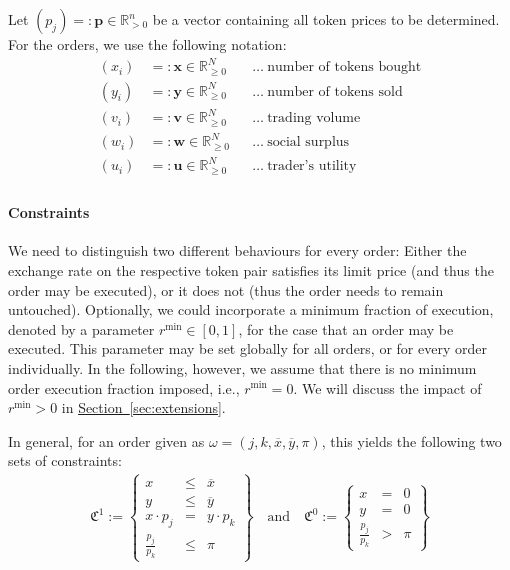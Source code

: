 \documentclass[11pt,parskip=full]{scrartcl}%
\newcommand*{\ie}{i.e., }
\newcommand*{\Min}{\mathrm{min}}
\newcommand*{\secref}[1]{\hyperref[{#1}]{Section~\ref*{#1}}}
\begin{document}
Let $(p_j) =: \mathbf{p} \in \mathbb{R}^n_{> 0}$ be a vector containing all token prices to be determined.
For the orders, we use the following notation:
\begin{align*}
  (x_i) &=: \mathbf{x} \in \mathbb{R}^N_{\ge 0} && \ldots\>\text{number of tokens bought}\\
  (y_i) &=: \mathbf{y} \in \mathbb{R}^N_{\ge 0} && \ldots\>\text{number of tokens sold}\\[2mm]
  (v_i) &=: \mathbf{v} \in \mathbb{R}^N_{\ge 0} && \ldots\>\text{trading volume}\\
  (w_i) &=: \mathbf{w} \in \mathbb{R}^N_{\ge 0} && \ldots\>\text{social surplus}\\
  (u_i) &=: \mathbf{u} \in \mathbb{R}^N_{\ge 0} && \ldots\>\text{trader's utility}\\
\end{align*}


\paragraph{Constraints}

We need to distinguish two different behaviours for every order: Either the exchange rate
on the respective token pair satisfies its limit price (and thus the order may be executed), or it
does not (thus the order needs to remain untouched).
Optionally, we could incorporate a minimum fraction of execution, denoted by a parameter
$r^\Min \in [0,1]$, for the case that an order may be executed.
This parameter may be set globally for all orders, or for every order individually.
In the following, however, we assume that there is no minimum order execution fraction imposed,
\ie $r^\Min = 0$.
We will discuss the impact of $r^\Min>0$ in \secref{sec:extensions}.

In general, for an order given as $ \omega = (j,k,\overline{x},\overline{y},\pi) $, this yields
the following two sets of constraints:
\begin{align}
  \mathfrak{C}^1 := \left\{
  \begin{array}{rll}
    x &\le & \overline{x} \\
    y &\le & \overline{y} \\
    x \cdot p_j &= & y \cdot p_k \\[1mm]
    \frac{p_j}{p_k} &\le & \pi
  \end{array}
  \right\}
  \quad
  \text{and}
  \quad
  \mathfrak{C}^0 := \left\{
  \begin{array}{rll}
    x &= & 0 \\
    y &= & 0 \\[1mm]
    \frac{p_j}{p_k} &> & \pi
  \end{array}
  \right\}
  \label{eq:order_model_generic}
\end{align}
\end{document}

